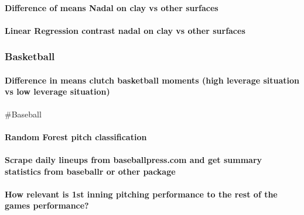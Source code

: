 \documentclass[]{article}
\let\oldparagraph\paragraph
\renewcommand{\paragraph}[1]{\oldparagraph{#1}\mbox{}}
\begin{document}
\hypertarget{difference-of-means-nadal-on-clay-vs-other-surfaces}{%
\paragraph{Difference of means Nadal on clay vs other
surfaces}\label{difference-of-means-nadal-on-clay-vs-other-surfaces}}

\hypertarget{linear-regression-contrast-nadal-on-clay-vs-other-surfaces}{%
\paragraph{Linear Regression contrast nadal on clay vs other
surfaces}\label{linear-regression-contrast-nadal-on-clay-vs-other-surfaces}}

\hypertarget{basketball}{%
\subsubsection{Basketball}\label{basketball}}

\hypertarget{difference-in-means-clutch-basketball-moments-high-leverage-situation-vs-low-leverage-situation}{%
\paragraph{Difference in means clutch basketball moments (high leverage
situation vs low leverage
situation)}\label{difference-in-means-clutch-basketball-moments-high-leverage-situation-vs-low-leverage-situation}}

\#Baseball

\hypertarget{random-forest-pitch-classification}{%
\paragraph{Random Forest pitch
classification}\label{random-forest-pitch-classification}}

\hypertarget{scrape-daily-lineups-from-baseballpress.com-and-get-summary-statistics-from-baseballr-or-other-package}{%
\paragraph{Scrape daily lineups from baseballpress.com and get summary
statistics from baseballr or other
package}\label{scrape-daily-lineups-from-baseballpress.com-and-get-summary-statistics-from-baseballr-or-other-package}}

\hypertarget{how-relevant-is-1st-inning-pitching-performance-to-the-rest-of-the-games-performance}{%
\paragraph{How relevant is 1st inning pitching performance to the rest
of the games
performance?}\label{how-relevant-is-1st-inning-pitching-performance-to-the-rest-of-the-games-performance}}
\end{document}
